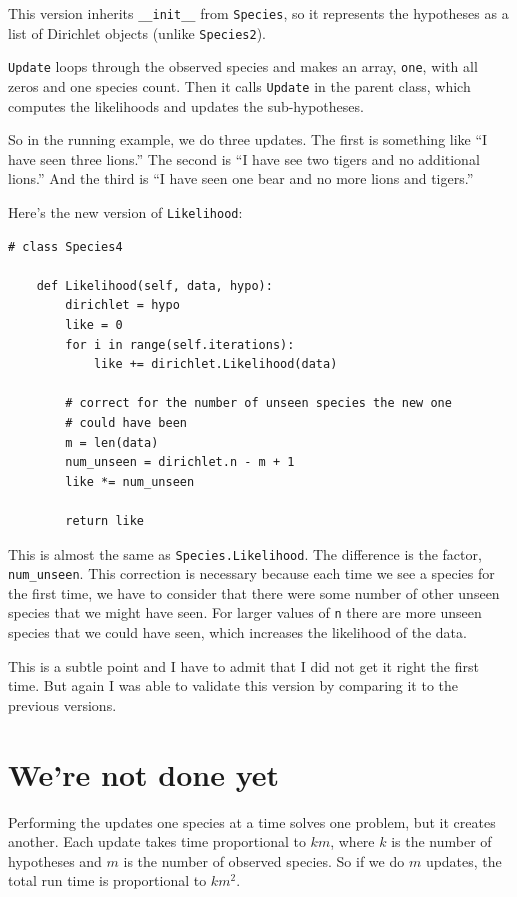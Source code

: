 \documentclass[12pt]{book}
\begin{document}
This version inherits \verb"__init__" from {\tt Species}, so it
represents the hypotheses as a list of Dirichlet objects (unlike
{\tt Species2}).

{\tt Update} loops through the observed species and makes an
array, {\tt one}, with all zeros and one species count.  Then
it calls {\tt Update} in the parent class, which computes
the likelihoods and updates the sub-hypotheses.

So in the running example, we do three updates.  The first
is something like ``I have seen three lions.''  The second is
``I have see two tigers and no additional lions.''  And the third
is ``I have seen one bear and no more lions and tigers.''

Here's the new version of {\tt Likelihood}:

\begin{verbatim}
# class Species4

    def Likelihood(self, data, hypo):
        dirichlet = hypo
        like = 0
        for i in range(self.iterations):
            like += dirichlet.Likelihood(data)

        # correct for the number of unseen species the new one
        # could have been
        m = len(data)
        num_unseen = dirichlet.n - m + 1
        like *= num_unseen

        return like
\end{verbatim}

This is almost the same as {\tt Species.Likelihood}.  The difference
is the factor, \verb"num_unseen".  This correction is necessary
because each time we see a species for the first time, we have to
consider that there were some number of other unseen species that
we might have seen.  For larger values of {\tt n} there are more
unseen species that we could have seen, which increases the likelihood
of the data.

This is a subtle point and I have to admit that I did not get it right
the first time.  But again I was able to validate this version
by comparing it to the previous versions.


\section{We're not done yet}

\newcommand{\BigO}[1]{\mathcal{O}(#1)}

Performing the updates one species at a time solves one problem, but
it creates another.  Each update takes time proportional to $k m$,
where $k$ is the number of hypotheses and $m$ is the number of observed
species.  So if we do $m$ updates, the total run time is
proportional to $k m^2$. 
\end{document}
